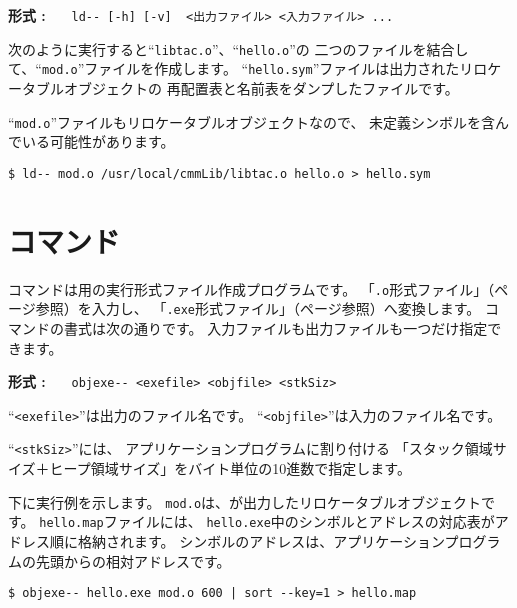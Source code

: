 \begin{flushleft}
{\bf 形式 : }~~~\verb/ld-- [-h] [-v]  <出力ファイル> <入力ファイル> .../
\end{flushleft}

次のように実行すると``\verb/libtac.o/''、``\verb/hello.o/''の
二つのファイルを結合して、``\verb/mod.o/''ファイルを作成します。
``\verb/hello.sym/''ファイルは出力されたリロケータブルオブジェクトの
再配置表と名前表をダンプしたファイルです。

``\verb/mod.o/''ファイルもリロケータブルオブジェクトなので、
未定義シンボルを含んでいる可能性があります。

\begin{mylist}
\begin{verbatim}
$ ld-- mod.o /usr/local/cmmLib/libtac.o hello.o > hello.sym
\end{verbatim}
\end{mylist}

\section{{\objexe}コマンド}

{\objexe}コマンドは{\tacos}用の実行形式ファイル作成プログラムです。
「\verb/.o/形式ファイル」（\pageref{app:oformat}ページ参照）を入力し、
「\verb/.exe/形式ファイル」（\pageref{app:eformat}ページ参照）へ変換します。
{\objexe}コマンドの書式は次の通りです。
入力ファイルも出力ファイルも一つだけ指定できます。

\begin{flushleft}
{\bf 形式 : }~~~\verb/objexe-- <exefile> <objfile> <stkSiz>/
\end{flushleft}

``\verb/<exefile>/''は出力のファイル名です。
``\verb/<objfile>/''は入力のファイル名です。

``\verb/<stkSiz>/''には、
アプリケーションプログラムに割り付ける
「スタック領域サイズ＋ヒープ領域サイズ」をバイト単位の10進数で指定します。

下に実行例を示します。
\verb/mod.o/は、\ld が出力したリロケータブルオブジェクトです。
\verb/hello.map/ファイルには、
\verb/hello.exe/中のシンボルとアドレスの対応表がアドレス順に格納されます。
シンボルのアドレスは、アプリケーションプログラムの先頭からの相対アドレスです。

\begin{mylist}
\begin{verbatim}
$ objexe-- hello.exe mod.o 600 | sort --key=1 > hello.map
\end{verbatim}
\end{mylist}

